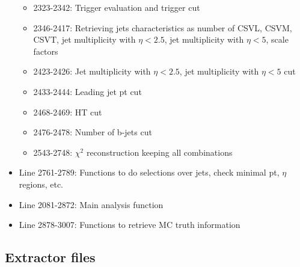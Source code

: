 \documentclass[11pt,a4paper]{article}
\begin{document}
\begin{itemize}
  \begin{itemize}
  \item 2323-2342: Trigger evaluation and trigger cut
  \item 2346-2417: Retrieving jets characteristics as number of CSVL, CSVM, CSVT, jet multiplicity with $\eta<2.5$, jet multiplicity with $\eta<5$, scale factors
  \item 2423-2426: Jet multiplicity with $\eta<2.5$, jet multiplicity with $\eta<5$ cut
  \item 2433-2444: Leading jet pt cut
  \item 2468-2469: HT cut
  \item 2476-2478: Number of b-jets cut
  \item 2543-2748: $\chi^{2}$ reconstruction keeping all combinations
  \end{itemize}
\item Line 2761-2789: Functions to do selections over jets, check minimal pt, $\eta$ regions, etc.
\item Line 2081-2872: Main analysis function
\item Line 2878-3007: Functions to retrieve MC truth information
\end{itemize}

\subsection{Extractor files}
\end{document}
